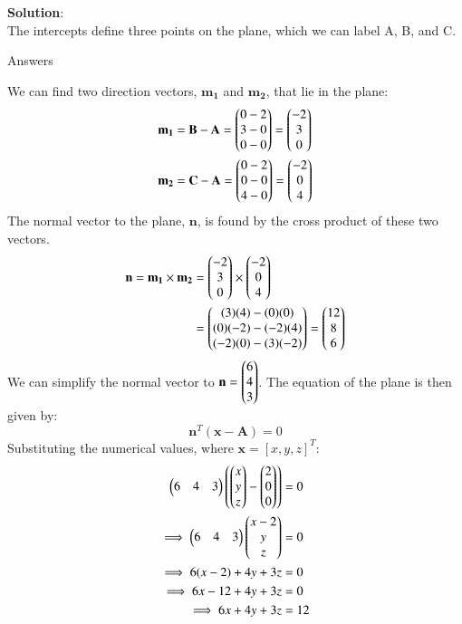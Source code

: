 \documentclass[journal]{IEEEtran}
\begin{document}
\textbf{Solution}:\\
The intercepts define three points on the plane, which we can label A, B, and C.
\begin{table}[H]    
  \centering
  
  \caption{Answers}
  \label{Answers}
\end{table}
We can find two direction vectors, $\mathbf{m_1}$ and $\mathbf{m_2}$, that lie in the plane:
\begin{align*}
    \mathbf{m_1} &= \mathbf{B} - \mathbf{A} = \begin{pmatrix}0-2\\3-0\\0-0\end{pmatrix} = \begin{pmatrix}-2\\3\\0\end{pmatrix} \\
    \mathbf{m_2} &= \mathbf{C} - \mathbf{A} = \begin{pmatrix}0-2\\0-0\\4-0\end{pmatrix} = \begin{pmatrix}-2\\0\\4\end{pmatrix}
\end{align*}
The normal vector to the plane, $\mathbf{n}$, is found by the cross product of these two vectors.
\begin{align*}
    \mathbf{n} = \mathbf{m_1} \times \mathbf{m_2} &= \begin{pmatrix}-2\\3\\0\end{pmatrix} \times \begin{pmatrix}-2\\0\\4\end{pmatrix} \\
    &= \begin{pmatrix}(3)(4) - (0)(0) \\ (0)(-2) - (-2)(4) \\ (-2)(0) - (3)(-2)\end{pmatrix} = \begin{pmatrix}12\\8\\6\end{pmatrix}
\end{align*}
We can simplify the normal vector to $\mathbf{n} = \begin{pmatrix}6\\4\\3\end{pmatrix}$. The equation of the plane is then given by:
\[ \mathbf{n}^T (\mathbf{x} - \mathbf{A}) = 0 \]
Substituting the numerical values, where $\mathbf{x} = [x, y, z]^T$:
\begin{align*}
    \begin{pmatrix}6 & 4 & 3\end{pmatrix} \left( \begin{pmatrix}x\\y\\z\end{pmatrix} - \begin{pmatrix}2\\0\\0\end{pmatrix} \right) &= 0 \\
    \implies \begin{pmatrix}6 & 4 & 3\end{pmatrix} \begin{pmatrix}x-2\\y\\z\end{pmatrix} &= 0 \\
    \implies 6(x-2) + 4y + 3z &= 0 \\
    \implies 6x - 12 + 4y + 3z &= 0 \\
    \implies 6x + 4y + 3z &= 12
\end{align*}
\end{document}
